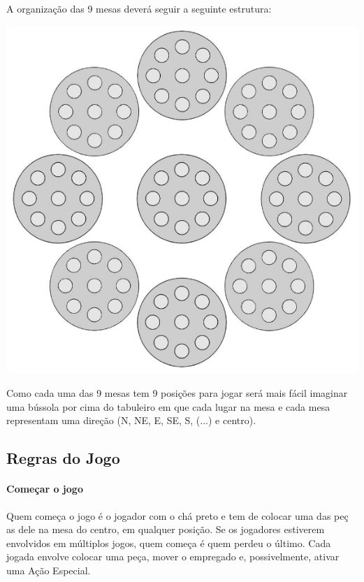 \documentclass[a4paper]{article}
\begin{document}
A organização das 9 mesas deverá seguir a seguinte estrutura: \newline \newline
\begin{center}
\includegraphics[scale=0.5]{board-setup.png}\linebreak\linebreak
\end{center}

Como cada uma das 9 mesas tem 9 posições para jogar será mais fácil imaginar uma bússola por cima do tabuleiro em que cada lugar na mesa e cada mesa representam uma direção (N, NE, E, SE, S, (...) e centro). 

\subsection{Regras do Jogo}
\paragraph{Começar o jogo}
Quem começa o jogo é o jogador com o chá preto e tem de colocar uma das peç
as dele na mesa do centro, em qualquer posição. Se os jogadores estiverem envolvidos em múltiplos jogos, quem começa é quem perdeu o último. Cada jogada envolve colocar uma peça, mover o empregado e, possivelmente, ativar uma Ação Especial.
\end{document}

